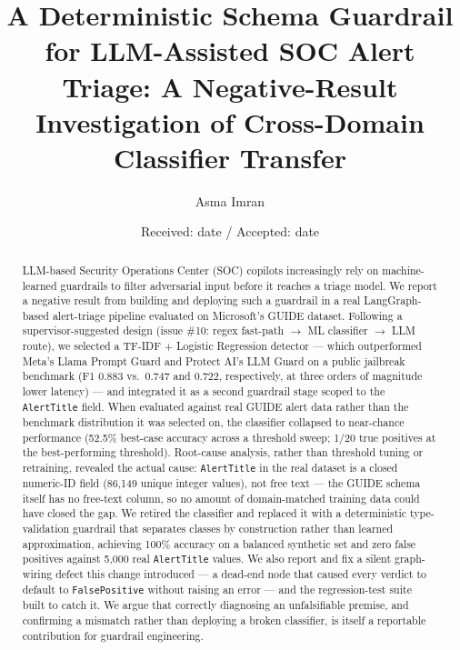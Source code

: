 \documentclass[twocolumn]{svjour3}
\begin{document}
\title{A Deterministic Schema Guardrail for LLM-Assisted SOC Alert Triage: A Negative-Result Investigation of Cross-Domain Classifier Transfer}

\author{Asma Imran}


\date{Received: date / Accepted: date}

\maketitle

\begin{abstract}
LLM-based Security Operations Center (SOC) copilots increasingly rely on machine-learned guardrails to filter adversarial input before it reaches a triage model. We report a negative result from building and deploying such a guardrail in a real LangGraph-based alert-triage pipeline evaluated on Microsoft's GUIDE dataset. Following a supervisor-suggested design (issue \#10: regex fast-path $\rightarrow$ ML classifier $\rightarrow$ LLM route), we selected a TF-IDF + Logistic Regression detector --- which outperformed Meta's Llama Prompt Guard and Protect AI's LLM Guard on a public jailbreak benchmark (F1 0.883 vs.\ 0.747 and 0.722, respectively, at three orders of magnitude lower latency) --- and integrated it as a second guardrail stage scoped to the \texttt{AlertTitle} field. When evaluated against real GUIDE alert data rather than the benchmark distribution it was selected on, the classifier collapsed to near-chance performance (52.5\% best-case accuracy across a threshold sweep; 1/20 true positives at the best-performing threshold). Root-cause analysis, rather than threshold tuning or retraining, revealed the actual cause: \texttt{AlertTitle} in the real dataset is a closed numeric-ID field (86{,}149 unique integer values), not free text --- the GUIDE schema itself has no free-text column, so no amount of domain-matched training data could have closed the gap. We retired the classifier and replaced it with a deterministic type-validation guardrail that separates classes by construction rather than learned approximation, achieving 100\% accuracy on a balanced synthetic set and zero false positives against 5{,}000 real \texttt{AlertTitle} values. We also report and fix a silent graph-wiring defect this change introduced --- a dead-end node that caused every verdict to default to \texttt{FalsePositive} without raising an error --- and the regression-test suite built to catch it. We argue that correctly diagnosing an unfalsifiable premise, and confirming a mismatch rather than deploying a broken classifier, is itself a reportable contribution for guardrail engineering.
\end{abstract}
\end{document}
